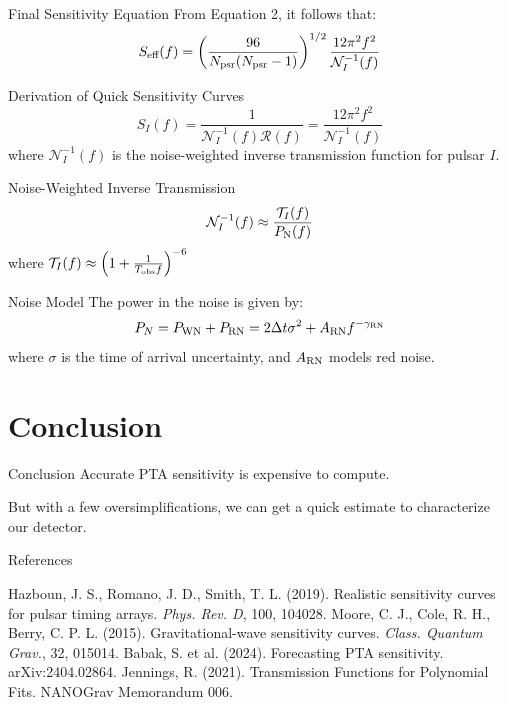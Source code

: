 \documentclass{beamer}
\begin{document}
\begin{frame}{Final Sensitivity Equation}
    From Equation 2, it follows that:
    \[
    S_{\text{eff}}(f) = \left(\frac{96}{N_{\rm psr}(N_{\rm psr}-1)}\right)^{1/2} \frac{12\pi^2f^2}{\mathcal{N}^{-1}_I(f)}
    \]
\end{frame}

\begin{frame}{Derivation of Quick Sensitivity Curves}
    \[
    S_{I}(f) = \frac{1}{\mathcal{N}_I^{-1}(f)\mathcal{R}(f)} = \frac{12\pi^2f^2}{\mathcal{N}_I^{-1}(f)}
    \]
    where $\mathcal{N}_I^{-1}(f)$ is the noise-weighted inverse transmission function for pulsar $I$.
\end{frame}

\begin{frame}{Noise-Weighted Inverse Transmission}
    \[
    \mathcal{N}^{-1}_I(f) \approx \frac{\mathcal{T}_I(f)}{P_{\rm N}(f)}
    \]
    where $\mathcal{T}_I(f) \approx \left(1 + \frac{1}{T_{\rm obs}f}\right)^{-6}$
\end{frame}

\begin{frame}{Noise Model}
    The power in the noise is given by:
    \[
    P_{N} = P_{\rm WN} + P_{\rm RN} = 2\Delta t\sigma^2 + A_{\rm RN}f^{-\gamma_{\rm RN}}
    \]
    where $\sigma$ is the time of arrival uncertainty, and $A_{\rm RN}$ models red noise.
\end{frame}

\section{Conclusion}
\begin{frame}{Conclusion}
    Accurate PTA sensitivity is expensive to compute.

    But with a few oversimplifications, we can get a quick estimate to characterize our detector.

\end{frame}

\begin{frame}{References}
    \begin{thebibliography}{1}
         Hazboun, J. S., Romano, J. D., Smith, T. L. (2019). Realistic sensitivity curves for pulsar timing arrays. \textit{Phys. Rev. D}, 100, 104028.
         Moore, C. J., Cole, R. H., Berry, C. P. L. (2015). Gravitational-wave sensitivity curves. \textit{Class. Quantum Grav.}, 32, 015014.
         Babak, S. et al. (2024). Forecasting PTA sensitivity. arXiv:2404.02864.
         Jennings, R. (2021). Transmission Functions for Polynomial Fits. NANOGrav Memorandum 006.
    \end{thebibliography}
\end{frame}
\end{document}
